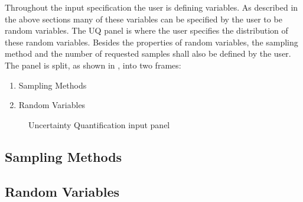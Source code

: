 Throughout the input specification the user is defining variables. As
described in the above sections many of these variables can be
specified by the user to be random variables. The UQ panel is where the user specifies the distribution of these random variables. Besides the properties of random variables, the sampling method and the number of requested samples shall also be defined by the user. The panel is split, as shown
in , into two frames:

\begin{enumerate}
\item Sampling Methods 
\item Random Variables
\end{enumerate}

\begin{figure}[!htbp]
  \caption{Uncertainty Quantification input panel}
  \label{fig:uq_panel}
\end{figure}

\subsection{Sampling Methods}


\subsection{Random Variables}

